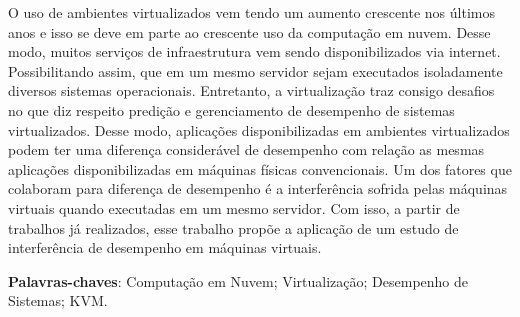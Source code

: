 \begin{resumo}
 O uso de ambientes virtualizados vem tendo um aumento crescente nos últimos anos e isso se deve em parte ao crescente uso da computação em nuvem. Desse modo, muitos serviços de infraestrutura vem sendo disponibilizados via internet. Possibilitando assim, que em um mesmo servidor sejam executados isoladamente diversos sistemas operacionais. Entretanto, a virtualização traz consigo desafios no que diz respeito predição e gerenciamento de desempenho de sistemas virtualizados. Desse modo, aplicações disponibilizadas em ambientes virtualizados podem ter uma diferença considerável de desempenho com relação as mesmas aplicações disponibilizadas em máquinas físicas convencionais. Um dos fatores que colaboram para diferença de desempenho é a interferência sofrida pelas máquinas virtuais quando executadas em um mesmo servidor. Com isso, a partir de trabalhos já realizados, esse trabalho propõe a aplicação de um estudo de interferência de desempenho em máquinas virtuais.  %





 \vspace{\onelineskip}
    
 \noindent
 \textbf{Palavras-chaves}: Computação em Nuvem; Virtualização; Desempenho de Sistemas; KVM.
\end{resumo}
